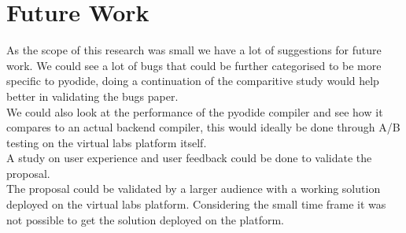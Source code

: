 \section{Future Work}
As the scope of this research was small we have a lot of suggestions for future work. We could see a lot of bugs that could be further categorised to be more specific to pyodide, doing a continuation of the comparitive study would help better in validating the bugs paper. \\
We could also look at the performance of the pyodide compiler and see how it compares to an actual backend compiler, this would ideally be done through A/B testing on the virtual labs platform itself. \\
A study on user experience and user feedback could be done to validate the proposal. \\
The proposal could be validated by a larger audience with a working solution deployed on the virtual labs platform. Considering the small time frame it was not possible to get the solution deployed on the platform. \\
